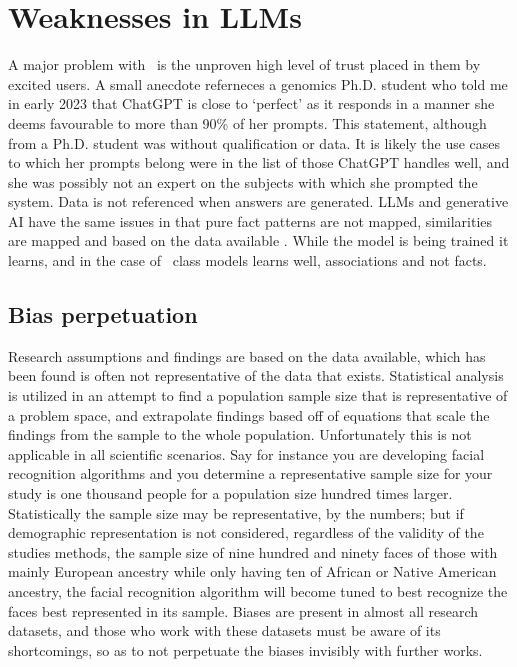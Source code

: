 \section{Weaknesses in LLMs}
A major problem with \llms\ is the unproven high level of trust placed in them by excited users.
A small anecdote referneces a genomics Ph.D. student who told me in early 2023 that ChatGPT is close to `perfect' as it responds in a manner she deems favourable to more than 90\% of her prompts.
This statement, although from a Ph.D. student was without qualification or data.
It is likely the use cases to which her prompts belong were in the list of those ChatGPT handles well, and she was possibly not an expert on the subjects with which she prompted the system.
Data is not referenced when answers are generated.
LLMs and generative AI have the same issues in that pure fact patterns are not mapped, similarities are mapped and based on the data available \cite{Floridi:2023}.
While the model is being trained it learns, and in the case of \gpts\ class models learns well, associations and not facts.

\subsection{Bias perpetuation}
Research assumptions and findings are based on the data available, which has been found is often not representative of the data that exists.
Statistical analysis is utilized in an attempt to find a population sample size that is representative of a problem space, and extrapolate findings based off of equations that scale the findings from the sample to the whole population.
Unfortunately this is not applicable in all scientific scenarios.
Say for instance you are developing facial recognition algorithms and you determine a representative sample size for your study is one thousand people for a population size hundred times larger.
Statistically the sample size may be representative, by the numbers; but if demographic representation is not considered, regardless of the validity of the studies methods, the sample size of nine hundred and ninety faces of those with mainly European ancestry while only having ten of African or Native American ancestry, the facial recognition algorithm will become tuned to best recognize the faces best represented in its sample.
Biases are present in almost all research datasets, and those who work with these datasets must be aware of its shortcomings, so as to not perpetuate the biases invisibly with further works.

